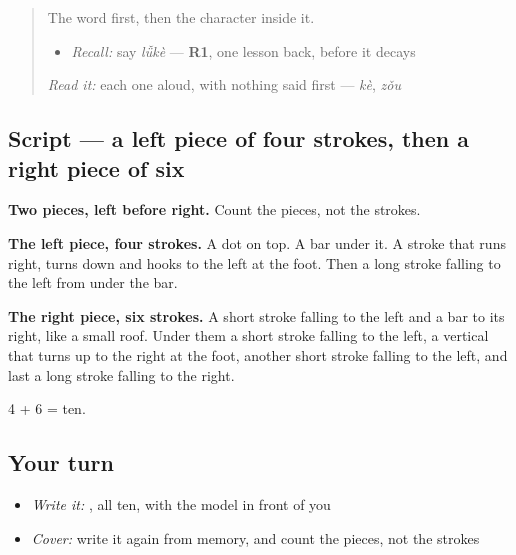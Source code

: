 \label{lesson:ZH-W403-lu-travel}



\begin{quote}
The word first, then the character inside it.

\begin{itemize}
\raggedright
  \item \emph{Recall:} say \emph{lǚkè} — \textbf{R1}, one lesson back, before it decays
\end{itemize}

\begin{quote}
 
\end{quote}

\emph{Read it:} each one aloud, with nothing said first — \emph{kè}, \emph{zǒu}
\end{quote}

\subsection*{Script — a left piece of four strokes, then a right piece of six}

\begin{quote}
\end{quote}

\textbf{Two pieces, left before right.} Count the pieces, not the strokes.

\textbf{The left piece, four strokes.} A dot on top. A bar under it. A stroke that runs right, turns down and hooks to the left at the foot. Then a long stroke falling to the left from under the bar.

\textbf{The right piece, six strokes.} A short stroke falling to the left and a bar to its right, like a small roof. Under them a short stroke falling to the left, a vertical that turns up to the right at the foot, another short stroke falling to the left, and last a long stroke falling to the right.

4 + 6 = ten.

\subsection*{Your turn}
\begin{itemize}
\raggedright
  \item \emph{Write it:} , all ten, with the model in front of you
  \item \emph{Cover:} write it again from memory, and count the pieces, not the strokes
\end{itemize}

